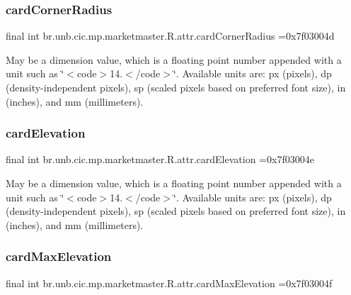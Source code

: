 \subsubsection{\texorpdfstring{card\+Corner\+Radius}{cardCornerRadius}}
{\footnotesize\ttfamily final int br.\+unb.\+cic.\+mp.\+marketmaster.\+R.\+attr.\+card\+Corner\+Radius =0x7f03004d\hspace{0.3cm}{\ttfamily [static]}}

May be a dimension value, which is a floating point number appended with a unit such as \char`\"{}$<$code$>$14.\+5sp$<$/code$>$\char`\"{}. Available units are\+: px (pixels), dp (density-\/independent pixels), sp (scaled pixels based on preferred font size), in (inches), and mm (millimeters). \mbox{\label{classbr_1_1unb_1_1cic_1_1mp_1_1marketmaster_1_1R_1_1attr_a4304b5dff0c9652f10b43d2329345b23}} 
\subsubsection{\texorpdfstring{card\+Elevation}{cardElevation}}
{\footnotesize\ttfamily final int br.\+unb.\+cic.\+mp.\+marketmaster.\+R.\+attr.\+card\+Elevation =0x7f03004e\hspace{0.3cm}{\ttfamily [static]}}

May be a dimension value, which is a floating point number appended with a unit such as \char`\"{}$<$code$>$14.\+5sp$<$/code$>$\char`\"{}. Available units are\+: px (pixels), dp (density-\/independent pixels), sp (scaled pixels based on preferred font size), in (inches), and mm (millimeters). \mbox{\label{classbr_1_1unb_1_1cic_1_1mp_1_1marketmaster_1_1R_1_1attr_a2e8b0ca3f41d7b8f43be9b09020f5eac}} 
\subsubsection{\texorpdfstring{card\+Max\+Elevation}{cardMaxElevation}}
{\footnotesize\ttfamily final int br.\+unb.\+cic.\+mp.\+marketmaster.\+R.\+attr.\+card\+Max\+Elevation =0x7f03004f\hspace{0.3cm}{\ttfamily [static]}}

